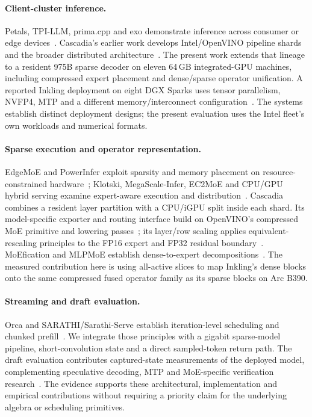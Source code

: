 \documentclass[11pt]{article}
\begin{document}
\paragraph{Client-cluster inference.}
Petals, TPI-LLM, prima.cpp and exo demonstrate inference across consumer or edge devices~\cite{petals,tpi,prima,exo}. Cascadia's earlier work develops Intel/OpenVINO pipeline shards and the broader distributed architecture~\cite{shards,architecture}. The present work extends that lineage to a resident 975B sparse decoder on eleven 64\,GB integrated-GPU machines, including compressed expert placement and dense/sparse operator unification. A reported Inkling deployment on eight DGX Sparks uses tensor parallelism, NVFP4, MTP and a different memory/interconnect configuration~\cite{sparkinkling}. The systems establish distinct deployment designs; the present evaluation uses the Intel fleet's own workloads and numerical formats.

\paragraph{Sparse execution and operator representation.}
EdgeMoE and PowerInfer exploit sparsity and memory placement on resource-constrained hardware~\cite{edgemoe,powerinfer}; Klotski, MegaScale-Infer, EC2MoE and CPU/GPU hybrid serving examine expert-aware execution and distribution~\cite{klotski,megascale,ec2moe,hybrid2026}. Cascadia combines a resident layer partition with a CPU/iGPU split inside each shard. Its model-specific exporter and routing interface build on OpenVINO's compressed MoE primitive and lowering passes~\cite{ovmoe,ovmoelowering}; its layer/row scaling applies equivalent-rescaling principles to the FP16 expert and FP32 residual boundary~\cite{smoothquant}. MoEfication and MLPMoE establish dense-to-expert decompositions~\cite{moefication,mlpmoe}. The measured contribution here is using all-active slices to map Inkling's dense blocks onto the same compressed fused operator family as its sparse blocks on Arc B390.

\paragraph{Streaming and draft evaluation.}
Orca and SARATHI/Sarathi-Serve establish iteration-level scheduling and chunked prefill~\cite{orca,sarathi,sarathiserve}. We integrate those principles with a gigabit sparse-model pipeline, short-convolution state and a direct sampled-token return path. The draft evaluation contributes captured-state measurements of the deployed model, complementing speculative decoding, MTP and MoE-specific verification research~\cite{specdecode,mtp,moesd}. The evidence supports these architectural, implementation and empirical contributions without requiring a priority claim for the underlying algebra or scheduling primitives.
\end{document}
